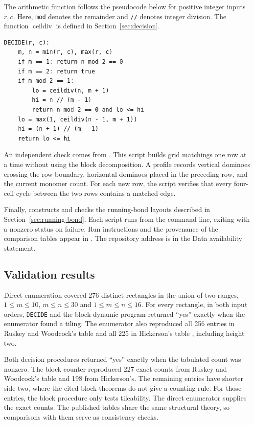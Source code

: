 \documentclass[11pt, reqno]{amsart}
\theoremstyle{definition}
\theoremstyle{remark}
\numberwithin{equation}{section}
\begin{document}
The arithmetic function follows the pseudocode below for positive
integer inputs $r,c$. Here, \texttt{mod} denotes the remainder and
\texttt{//} denotes integer division. The function
$\operatorname{ceildiv}$ is defined in Section~\ref{sec:decision}.
\begin{verbatim}
DECIDE(r, c):
    m, n = min(r, c), max(r, c)
    if m == 1: return n mod 2 == 0
    if m == 2: return true
    if m mod 2 == 1:
        lo = ceildiv(n, m + 1)
        hi = n // (m - 1)
        return n mod 2 == 0 and lo <= hi
    lo = max(1, ceildiv(n - 1, m + 1))
    hi = (n + 1) // (m - 1)
    return lo <= hi
\end{verbatim}

An independent check comes from \mbox{}.
This script builds grid matchings one row at a time without using the
block decomposition. A profile records vertical dominoes
crossing the row boundary, horizontal dominoes placed in the preceding
row, and the current monomer count. For each new row, the script
verifies that every four-cell cycle between the two rows contains a
matched edge.

Finally,  constructs and
checks the running-bond layouts described in Section~\ref{sec:running-bond}. Each script
runs from the command line, exiting with a nonzero status on failure.
Run instructions and the provenance of the comparison tables appear in
. The repository address is in the Data
availability statement.

\subsection{Validation results}
\label{sec:validation-results}

Direct enumeration covered 276 distinct rectangles in the union of
two ranges, $1\le m\le10$, $m\le n\le30$ and
$1\le m\le n\le16$. For every rectangle, in both input orders,
\texttt{DECIDE} and the block dynamic program returned ``yes'' exactly
when the enumerator found a tiling. The enumerator also reproduced
all 256 entries in Ruskey and Woodcock's table \cite[Table~2]{ruskey}
and all 225 in Hickerson's table \cite{hickerson}, including height two.

Both decision procedures returned ``yes'' exactly when the tabulated
count was nonzero. The block counter reproduced 227 exact
counts from Ruskey and Woodcock's table and 198 from Hickerson's.
The remaining entries have shorter side two, where the cited block
theorems do not give a counting rule. For those entries, the block
procedure only tests tileability. The direct enumerator supplies the
exact counts. The published tables share the same structural theory,
so comparisons with them serve as consistency checks.
\end{document}
